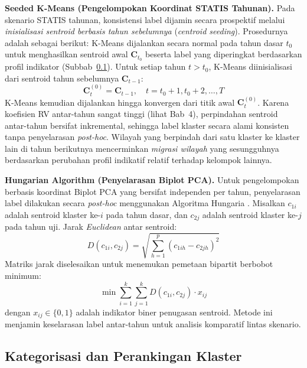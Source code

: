 \textbf{Seeded K-Means (Pengelompokan Koordinat STATIS Tahunan).} Pada skenario STATIS tahunan, konsistensi label dijamin secara prospektif melalui \textit{inisialisasi sentroid berbasis tahun sebelumnya} (\textit{centroid seeding}). Prosedurnya adalah sebagai berikut: K-Means dijalankan secara normal pada tahun dasar $t_0$ untuk menghasilkan sentroid awal $\mathbf{C}_{t_0}$ beserta label yang diperingkat berdasarkan profil indikator (Subbab~\ref{subsec:kategorisasi_perankingan}). Untuk setiap tahun $t > t_0$, K-Means diinisialisasi dari sentroid tahun sebelumnya $\mathbf{C}_{t-1}$:
\begin{equation} \label{eq:seeded_kmeans}
    \mathbf{C}_{t}^{(0)} = \mathbf{C}_{t-1}, \quad t = t_0+1, t_0+2, \ldots, T
\end{equation}
K-Means kemudian dijalankan hingga konvergen dari titik awal $\mathbf{C}_{t}^{(0)}$. Karena koefisien RV antar-tahun sangat tinggi (lihat Bab~4), perpindahan sentroid antar-tahun bersifat inkremental, sehingga label klaster secara alami konsisten tanpa penyelarasan \textit{post-hoc}. Wilayah yang berpindah dari satu klaster ke klaster lain di tahun berikutnya mencerminkan \textit{migrasi wilayah} yang sesungguhnya berdasarkan perubahan profil indikatif relatif terhadap kelompok lainnya.

\textbf{Hungarian Algorithm (Penyelarasan Biplot PCA).} Untuk pengelompokan berbasis koordinat Biplot PCA yang bersifat independen per tahun, penyelarasan label dilakukan secara \textit{post-hoc} menggunakan Algoritma Hungaria \citep{kuhn1955}. Misalkan $c_{1i}$ adalah sentroid klaster ke-$i$ pada tahun dasar, dan $c_{2j}$ adalah sentroid klaster ke-$j$ pada tahun uji. Jarak \textit{Euclidean} antar sentroid:
\begin{equation} \label{eq:dist_centroid}
    D(c_{1i}, c_{2j}) = \sqrt{\sum_{h=1}^{p} (c_{1ih} - c_{2jh})^2}
\end{equation}
Matriks jarak diselesaikan untuk menemukan pemetaan bipartit berbobot minimum:
\begin{equation} \label{eq:hungarian_min}
    \min \sum_{i=1}^{k} \sum_{j=1}^{k} D(c_{1i}, c_{2j}) \cdot x_{ij}
\end{equation}
dengan $x_{ij} \in \{0, 1\}$ adalah indikator biner penugasan sentroid. Metode ini menjamin keselarasan label antar-tahun untuk analisis komparatif lintas skenario.

\subsection{\normalsize Kategorisasi dan Perankingan Klaster} \label{subsec:kategorisasi_perankingan}

